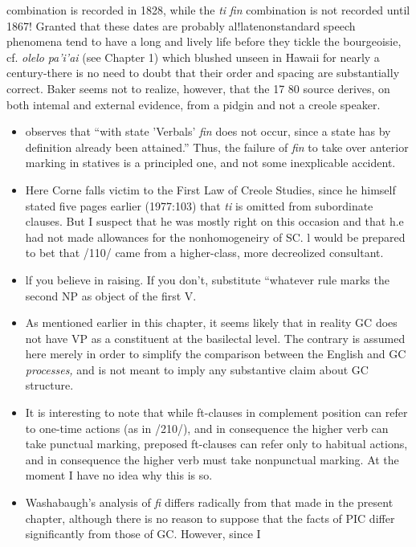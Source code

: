 
combination is recorded in 1828, while the \textit{ti} \textit{fin} combination is not recorded until 1867! Granted that these dates are probably al!late\-nonstandard speech phenomena tend to have a long and lively life before they tickle the bourgeoisie, cf. \textit{olelo} \textit{pa'i'ai} (see Chapter 1) which blushed unseen in Hawaii for nearly a century-there is no need to doubt that their order and spacing are substantially correct. Baker seems not to realize, however, that the 17 80 source derives, on both intemal and external evidence, from a pidgin and not a creole speaker.

\begin{itemize}
\item \citet{Corne1981} observes that ``with state 'Verbals' \textit{fin} does not occur, since a state has by definition already been attained.'' Thus, the failure of \textit{fin} to take over anterior marking in statives is a principled one, and not some inexplicable accident.
\item Here Corne falls victim to the First Law of Creole Studies, since he himself stated five pages earlier (1977:103) that \textit{ti} is omitted from subordinate clauses. But I suspect that he was mostly right on this occasion and that h.e had not made allowances for the nonhomogeneiry of SC. l would be prepared to bet that /110/ came from a higher-class, more decreolized consultant.
\item lf you believe in raising. If you don't, substitute ``whatever rule marks the second NP as object of the first V.{\textquotedbl}
\item As mentioned earlier in this chapter, it seems likely that in reality GC does not have VP as a constituent at the basilectal level. The contrary is assumed here merely in order to simplify the com\-parison between the English and GC \textit{processes,} and is not meant to imply any substantive claim about GC structure.
\item It is interesting to note that while ft-clauses in complement position can refer to one-time actions (as in /210/), and in consequence the higher verb can take punctual marking, preposed ft-clauses can refer only to habitual actions, and in consequence the higher verb must take nonpunctual marking. At the moment I have no idea why this is so.
\item Washabaugh's analysis of \textit{fi} differs radically from that made in the present chapter, although there is no reason to suppose that the facts of PIC differ significantly from those of GC. However, since I
\end{itemize}

